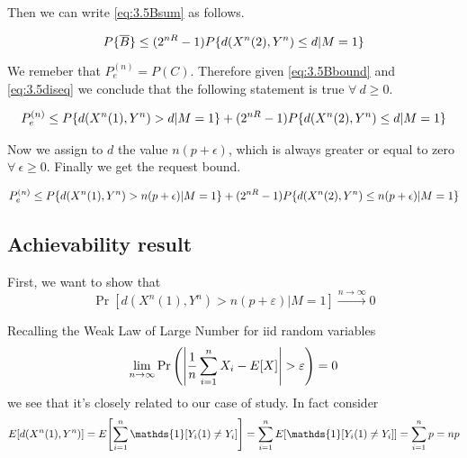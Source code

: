 Then we can write \eqref{eq:3.5Bsum} as follows.

\begin{equation}
	P\{\overline{B} \} \leq (2^{nR}-1) P \{ d(X^n(2),Y^n) \leq d | M = 1 \}
	\label{eq:3.5Bbound}
\end{equation}

We remeber that $P_e^{(n)}=P(C)$. Therefore given \eqref{eq:3.5Bbound} and \eqref{eq:3.5diseq} we conclude that the following statement is true $\forall \  d \geq 0$.

\begin{equation}
	\begin{gathered}
		P_e^{(n)} \leq
		P \{ d(X^n(1),Y^n)>d | M = 1 \} + (2^{nR}-1) P \{ d(X^n(2),Y^n) \leq d | M = 1 \}
	\end{gathered}
\end{equation}

Now we assign to $d$ the value $n(p+\epsilon)$, which is always greater or equal to zero $\forall \  \epsilon \geq 0$. Finally we get the request bound.

\begin{equation}
	\begin{gathered}
		P_e^{(n)} \leq
		P \{ d(X^n(1),Y^n)> n(p+\epsilon) | M = 1 \} + (2^{nR}-1) P \{ d(X^n(2),Y^n) \leq n(p+\epsilon) | M = 1 \}
	\end{gathered}
\end{equation}

\subsection{Achievability result}

First, we want to show that
%
\begin{equation}\label{eq:3.5c_goal}
\Pr[d(X^n(1),Y^n)>n(p+\varepsilon) | M=1] \xrightarrow{n\rightarrow \infty} 0
\end{equation}

Recalling the Weak Law of Large Number for iid random variables
%
\begin{equation}
\lim_{n \rightarrow \infty} \Pr \qty( \qty|\frac{1}{n} \sum_{i=1}^{n} X_i - E[X]|> \varepsilon ) = 0
\end{equation}
%
we see that it's closely related to our case of study. In fact consider
%
\begin{equation}
E[d(X^n(1),Y^n)] = E\qty[ \sum_{i=1}^{n} \mathds{1}[Y_i(1) \neq Y_i] ] = \sum_{i=1}^n E[ \mathds{1}[Y_i(1) \neq Y_i] ] = \sum_{i=1}^n p = np
\end{equation}

